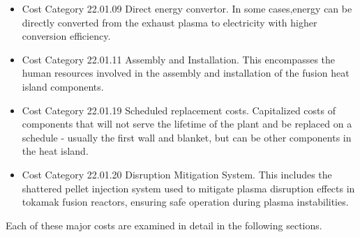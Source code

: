 \begin{itemize}
    \item Cost Category 22.01.09 Direct energy convertor. In some cases,energy can be directly converted from the exhaust plasma to electricity with higher conversion efficiency.
    
    \item Cost Category 22.01.11 Assembly and Installation. This encompasses the human resources involved in the assembly and installation of the fusion heat island components.

    \item Cost Category 22.01.19 Scheduled replacement costs.  Capitalized costs of components that will not serve the lifetime of the plant and be replaced on a schedule - usually the first wall and blanket, but can be other components in the heat island.

    \item Cost Category 22.01.20 Disruption Mitigation System. This includes the shattered pellet injection system used to mitigate plasma disruption effects in tokamak fusion reactors, ensuring safe operation during plasma instabilities.
 \end{itemize}


Each of these major costs are examined in detail in the following sections.